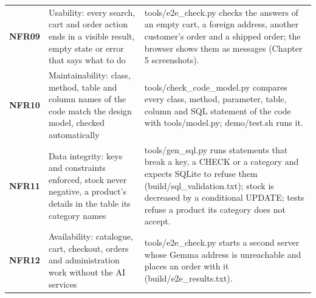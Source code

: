 \begin{longtable}{@{}P{1.3cm}P{5.0cm}P{8.7cm}@{}}
\small \textbf{NFR09} & \small Usability: every search, cart and order action ends in a visible result, empty state or error that says what to do & \small tools/e2e\_check.py checks the answers of an empty cart, a foreign address, another customer's order and a shipped order; the browser shows them as messages (Chapter 5 screenshots).\\
\small \textbf{NFR10} & \small Maintainability: class, method, table and column names of the code match the design model, checked automatically & \small tools/check\_code\_model.py compares every class, method, parameter, table, column and SQL statement of the code with tools/model.py; demo/test.sh runs it.\\
\small \textbf{NFR11} & \small Data integrity: keys and constraints enforced, stock never negative, a product's details in the table its category names & \small tools/gen\_sql.py runs statements that break a key, a CHECK or a category and expects SQLite to refuse them (build/sql\_validation.txt); stock is decreased by a conditional UPDATE; tests refuse a product its category does not accept.\\
\small \textbf{NFR12} & \small Availability: catalogue, cart, checkout, orders and administration work without the AI services & \small tools/e2e\_check.py starts a second server whose Gemma address is unreachable and places an order with it (build/e2e\_results.txt).\\
\end{longtable}
